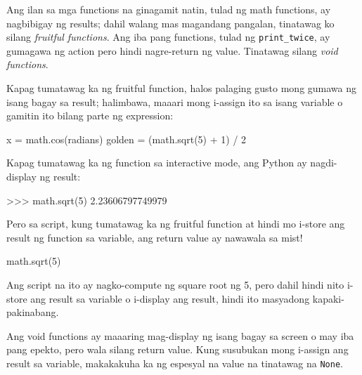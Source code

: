 \documentclass[10pt,]{book}
\newenvironment{Shaded}{}{}
\newcommand{\DecValTok}[1]{\textcolor[rgb]{0.25,0.63,0.44}{#1}}
\newcommand{\FloatTok}[1]{\textcolor[rgb]{0.25,0.63,0.44}{#1}}
\newcommand{\NormalTok}[1]{#1}
\newcommand{\OperatorTok}[1]{\textcolor[rgb]{0.40,0.40,0.40}{#1}}
\begin{document}
 
 

Ang ilan sa mga functions na ginagamit natin, tulad ng math functions,
ay nagbibigay ng results; dahil walang mas magandang pangalan, tinatawag
ko silang \emph{fruitful functions}. Ang iba pang functions, tulad ng
\texttt{print\_twice}, ay gumagawa ng action pero hindi nagre-return ng
value. Tinatawag silang \emph{void functions}.

Kapag tumatawag ka ng fruitful function, halos palaging gusto mong
gumawa ng isang bagay sa result; halimbawa, maaari mong i-assign ito sa
isang variable o gamitin ito bilang parte ng expression:

\begin{Shaded}
\begin{Highlighting}[]
\NormalTok{x }\OperatorTok{=}\NormalTok{ math.cos(radians)}
\NormalTok{golden }\OperatorTok{=}\NormalTok{ (math.sqrt(}\DecValTok{5}\NormalTok{) }\OperatorTok{+} \DecValTok{1}\NormalTok{) }\OperatorTok{/} \DecValTok{2}
\end{Highlighting}
\end{Shaded}

Kapag tumatawag ka ng function sa interactive mode, ang Python ay
nagdi-display ng result:

\begin{Shaded}
\begin{Highlighting}[]
\OperatorTok{\textgreater{}\textgreater{}\textgreater{}}\NormalTok{ math.sqrt(}\DecValTok{5}\NormalTok{)}
\FloatTok{2.23606797749979}
\end{Highlighting}
\end{Shaded}

Pero sa script, kung tumatawag ka ng fruitful function at hindi mo
i-store ang result ng function sa variable, ang return value ay nawawala
sa mist!

\begin{Shaded}
\begin{Highlighting}[]
\NormalTok{math.sqrt(}\DecValTok{5}\NormalTok{)}
\end{Highlighting}
\end{Shaded}

Ang script na ito ay nagko-compute ng square root ng 5, pero dahil hindi
nito i-store ang result sa variable o i-display ang result, hindi ito
masyadong kapaki-pakinabang.

 

Ang void functions ay maaaring mag-display ng isang bagay sa screen o
may iba pang epekto, pero wala silang return value. Kung susubukan mong
i-assign ang result sa variable, makakakuha ka ng espesyal na value na
tinatawag na \texttt{None}.
\end{document}
